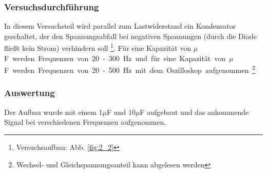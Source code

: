 \documentclass[12pt,a4paper]{article}
\begin{document}
\subsubsection{Versuchsdurchführung}

In diesem Versuchsteil wird parallel zum Lastwiderstand ein Kondensator geschaltet, der den Spannungsabfall bei negativen Spannungen (durch die Diode fließt kein Strom) verhindern soll \footnote{Versuchsaufbau: Abb. \ref{fig:2_2}}. Für eine Kapazität von \unit[10]{$\mu$F} werden Frequenzen von 20-300\unit{Hz} und für eine Kapazität von \unit[1]{$\mu$F} werden Frequenzen von 20-500\unit{Hz} mit dem Oszilloskop aufgenommen. \footnote{Wechsel- und Gleichspannungsanteil kann abgelesen werden}
\subsubsection{Auswertung}

Der Aufbau wurde mit einem 1$\mu$F und 10$\mu$F aufgebaut und das ankommende Signal bei verschiedenen Frequenzen aufgenommen.
\end{document}
